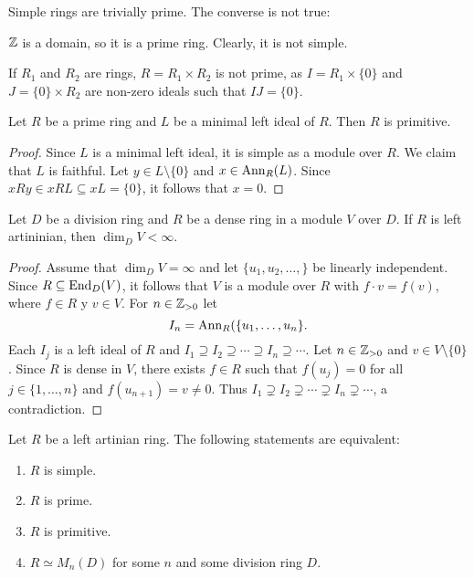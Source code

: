 Simple rings are trivially prime. The converse is not true:

\begin{example} 
    $\mathbb{Z}$ is a domain, so it is a prime ring. Clearly, it is not simple.
\end{example}

\begin{example}
	If $R_1$ and $R_2$ are rings, $R=R_1\times R_2$ is not prime, as 
	$I=R_1\times\{0\}$ and $J=\{0\}\times R_2$ are non-zero ideals such that $IJ=\{0\}$.
\end{example}

\begin{lemma}
	\label{lem:primoizqmin=>prim}
	Let $R$ be a prime ring and $L$ be a minimal left ideal of $R$.
	Then $R$ is primitive. 
\end{lemma}

\begin{proof}
	Since $L$ is a minimal left ideal, it is simple as a module over $R$. 
	We claim that $L$ is faithful. Let $y\in L\setminus\{0\}$ and
	$x\in\operatorname{Ann}_R(L)$. Since $xRy\in xRL\subseteq xL=\{0\}$, it follows that 
	$x=0$.
\end{proof}

\begin{lemma}
	\label{lem:denso_artiniano}
	Let $D$ be a division ring and $R$ be a dense ring in a module $V$ over $D$. 
	If $R$ is left artininian, then $\dim_DV<\infty$.
\end{lemma}

\begin{proof}
	Assume that $\dim_DV=\infty$ and let $\{u_1,u_2,\dots,\}$ be linearly independent. 
	Since $R\subseteq\operatorname{End}_D(V)$, it follows that 
	$V$ is a module over $R$ with $f\cdot v=f(v)$, where $f\in R$ y $v\in V$. 
	For $n\in\mathbb{Z}_{>0}$ let 
	\[
		I_n=\operatorname{Ann}_R(\{u_1,\dots,u_n\}.
	\]
	Each $I_j$ is a left ideal of $R$ and $I_1\supseteq
	I_2\supseteq\cdots\supseteq I_n\supseteq\cdots$. Let 
	$n\in\mathbb{Z}_{>0}$ and $v\in V\setminus\{0\}$. Since $R$ is dense
	in $V$, there exists $f\in R$ such that $f(u_j)=0$ for all $j\in\{1,\dots,n\}$ and 
	$f(u_{n+1})=v\ne0$. Thus $I_1\supsetneq I_2\supsetneq\cdots\supsetneq
	I_n\supsetneq\cdots$, a contradiction.
\end{proof}

\begin{theorem}[Wedderburn]
	Let $R$ be a left artinian ring. The following statements are equivalent:
	\begin{enumerate}
		\item $R$ is simple.
		\item $R$ is prime.
		\item $R$ is primitive.
		\item $R\simeq M_n(D)$ for some $n$ and some division ring $D$.
	\end{enumerate}
\end{theorem}

